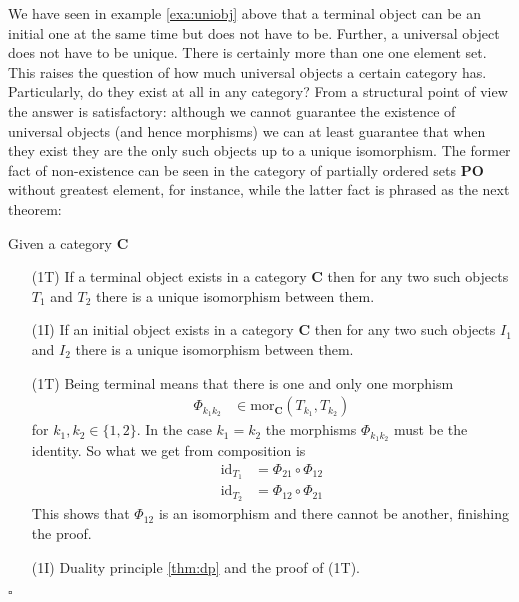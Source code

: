 We have seen in example \ref{exa:uniobj} above that a terminal object can be an initial one at the same time but does not have to be. Further, a universal object does not have to be unique. There is certainly more than one one element set. This raises the question of how much universal objects a certain category has. Particularly, do they exist at all in any category? From a structural point of view the answer is satisfactory: although we cannot guarantee the existence of universal objects (and hence morphisms) we can at least guarantee that when they exist they are the only such objects up to a unique isomorphism. The former fact of non-existence can be seen in the category of partially ordered sets $\mathbf{PO}$ without greatest element, for instance, while the latter fact is phrased as the next theorem:
\\
\begin{thm}
\label{thm:uniqueuniarr}
Given a category $\mathbf{C}$
\begin{enumerate}
\item[(1T)]
If a terminal object exists in a category $\mathbf{C}$ then for any two such objects $T_{1}$ and $T_{2}$ there is a unique isomorphism between them.
\item[(1I)]
If an initial object exists in a category $\mathbf{C}$ then for any two such objects $I_{1}$ and $I_{2}$ there is a unique isomorphism between them.
\end{enumerate}
\end{thm}
\begin{prf}
\begin{enumerate}
\item[(1T)]
Being terminal means that there is one and only one morphism
\begin{align*}
  \Phi_{k_{1}k_{2}}
  &\in
  \mathrm{mor}_{\mathbf{C}}(T_{k_{1}},T_{k_{2}})
\end{align*}
for $k_{1},k_{2} \in \lbrace 1,2 \rbrace$. In the case $k_{1} = k_{2}$ the morphisms $\Phi_{k_{1}k_{2}}$ must be the identity. So what we get from composition is
\begin{align*}
  \mathrm{id}_{T_{1}}
  &=
  \Phi_{21}
  \circ
  \Phi_{12}
  \\
  \mathrm{id}_{T_{2}}
  &=
  \Phi_{12}
  \circ
  \Phi_{21}
\end{align*}
This shows that $\Phi_{12}$ is an isomorphism and there cannot be another, finishing the proof.
\item[(1I)]
Duality principle \ref{thm:dp} and the proof of (1T).
\end{enumerate}
\phantom{proven}
\hfill
$\square$
\end{prf}
